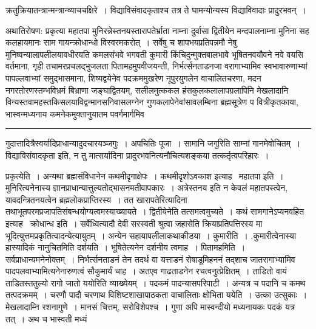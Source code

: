 \documentclass[11pt, openany]{book}
\begin{document}
\newpage

\noindent
क्रतुक्रियातन्त्रान्मन्त्रान्व्याचचक्षिरे~। विद्याविसंवादकृताश्च तत्र ते घामन्योन्यस्य विद्याविवादाः प्रादुरभवन्~।

अथातिरोषण: प्रकृत्या महातपा मुनिरन्नेस्तनयस्तारापतेर्भ्राता नाम्ना दुर्वासा द्वितीयेन मन्दपालनाम्ना मुनिना सह कलहायमानः साम गायन्क्रोधान्धो विस्वरमकरोत्~। सर्वेषु च शापभयप्रतिपन्नमौ नेषु मुनिष्वन्यालापलीलयावधीरयति कमलसंभवे भगवती कुमारी किंचिदुन्मुक्तबालभावे भूषितनवयौवने नवे वयसि वर्तमाना, गृही तचामरप्रचलद्भुजलता पितामहमुपवीजयन्ती, निर्भर्त्सनताडनजा वरागाभ्यामिव स्वभावारुणाभ्यां पापल्लवाभ्यां समुद्भासमाना, शिष्यद्वयेनेव पदक्रममुखरेण नूपुरयुगलेन वाचालितचरणा, मदन नगरतोरणस्तम्भविभ्रमं बिभ्राणा जङ्घाद्वितयम्, सलीलमुत्ककल हंसकुलकलालापग्रलापिनि मेखलादानि विन्यस्तवामहस्तकिसलयाविद्वन्मानसनिवासलग्नेन गुणकलापेनेवांसावलम्बिना ब्रह्मसूत्रेण प वित्रीकृतकाया, भास्वन्मध्यनाय कमनेकमुक्तानुयातम पवर्गमार्गमिव

\vspace{2mm}
\hrule

\noindent
{\s गुदात्तादित्रैस्वर्यादिप्राधान्यादुदचारयञ्जगुः~। अपचितिः पूजा~। सामानि जगुरिति साम्नां गानमेवोचितम्~। विद्याविसंवादकृता इति, न तु मात्सर्यादिना प्रादुरभवनित्यनौचित्यशङ्कया तत्कर्तृत्वपरिहारः~।

{\qtt प्रकृत्येति}~। अन्यथा ब्रह्मसंविधानेन कथमीदृगाक्षेपः~। कथमीदृशोऽवकाश इत्याह \textendash\ {\qtt महातपा इति}~। मुनिरित्यनेनास्य ज्ञानप्राधान्यात्तुल्यतोद्भासनमतीवापकारः~। अत्रेस्तनय इति न केवलं महातपस्त्वेन, यावदन्त्रितनयत्वेन ब्रह्मलोकप्राप्तिरस्य~। तत खारापतेरित्यादिना तथाभूतपरमप्रजापतिसंबन्धयोग्यत्वमस्याख्यायते~। द्वितीयेनेति तत्समत्वमुच्यते~। कथं सामगानेऽप्यनवहित इत्याह \textendash\ {\qtt क्रोधान्ध इति}~। सर्वेध्वित्यादौ देवी सरस्वती श्रुत्वा जहासेति क्रियाप्रतिपत्तिरस्य मा भूदित्युत्तमप्रकृतित्वादन्येत्यायुतम्~। अन्येन सहायापलीलाकथाकीडया~। {\qtt कुमारीति}~। .कुमारीत्वेनास्या हास्यादिकं नानुचितमिति दर्शयति~। भूषितेत्यनेन दर्शनीय त्वमाह~। {\qtt पितामहमिति}~। सर्वप्राधान्यमनेनोक्तम्~। निर्भर्त्सनताडनं तेन तदर्थ वा यत्ताडनं रोषाडूमिहननं तद्शाच जातरागाभ्यामिव पादपलवाभ्यामित्यनेनारुणत्वं सौकुमार्यं चाह~। अतएव गाढताडनेन रचत्वनुत्प्रेक्षितम्~। ताडितो वायं ताडितस्ततुल्यो रागो जातो ययोरिति व्याख्येयम्~। पदकमं पादन्यासपरिपाटी~। अन्यत्र च पदानि च कमथ तत्पदक्रमम्~। चरणौ पादौ चरणाथ विशिष्टशाखापाठकता वाचालिताः क्षोभिता ययेति~। उत्का उत्सुकाः~। मेखलादाम्नि रशनागुणे~। मानसं चित्तम्, सरोविशेपश्च~। गुणा अपि मास्वन्दीयो मध्यनायकः पदकं यत्र तत्~। अथ च भास्वती मध्यं}

\newpage
\end{document}
